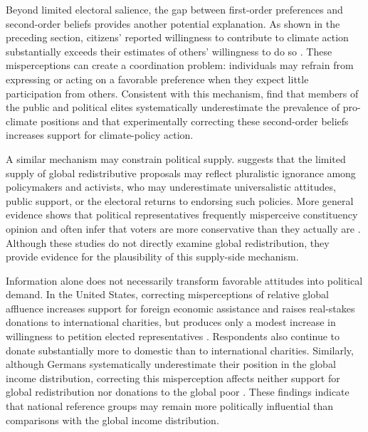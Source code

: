 \documentclass[11pt,a4paper]{article}
\begin{document}
Beyond limited electoral salience, %
the gap between first-order preferences and second-order beliefs provides another potential explanation. As shown in the preceding section, citizens' reported willingness to contribute to climate action substantially exceeds their estimates of others' willingness to do so \citep{andre_globally_2024}. These misperceptions can create a coordination problem: individuals may refrain from expressing or acting on a favorable preference when they expect little participation from others. Consistent with this mechanism, \citet{mildenberger_beliefs_2017} find that members of the public and political elites systematically underestimate the prevalence of pro-climate positions and that experimentally correcting these second-order beliefs increases support for climate-policy action.

A similar mechanism may constrain political supply. \citet{fabre_public_2026} suggests that the limited supply of global redistributive proposals may reflect pluralistic ignorance among policymakers and activists, who may underestimate universalistic attitudes, public support, or the electoral returns to endorsing such policies. More general evidence shows that political representatives frequently misperceive constituency opinion and often infer that voters are more conservative than they actually are \citep{broockman_bias_2018,pilet_politicians_2023}. Although these studies do not directly examine global redistribution, they provide evidence for the plausibility of this supply-side mechanism.

Information alone does not necessarily transform favorable attitudes into political demand. In the United States, correcting misperceptions of relative global affluence increases support for foreign economic assistance and raises real-stakes donations to international charities, but produces only a modest increase in willingness to petition elected representatives \citep{nair_misperceptions_2018}. Respondents also continue to donate substantially more to domestic than to international charities. Similarly, although Germans systematically underestimate their position in the global income distribution, correcting this misperception affects neither support for global redistribution nor donations to the global poor \citep{fehr_your_2019}. These findings indicate that national reference groups may remain more politically influential than comparisons with the global income distribution.
\end{document}
